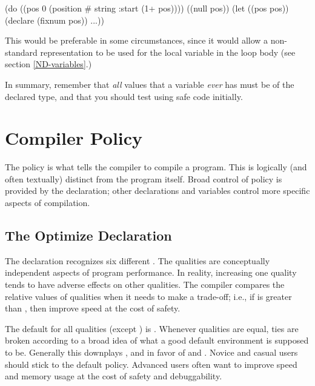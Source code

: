 \begin{example}
(do ((pos 0 (position # string :start (1+ pos))))
    ((null pos))
  (let ((pos pos))
    (declare (fixnum pos))
    ...))
\end{example}

This would be preferable in some circumstances, since it would allow a
non-standard representation to be used for the local 
variable in the loop body (see section \ref{ND-variables}.)

In summary, remember that {\em all} values that a variable {\em ever}
has must be of the declared type, and that you should test using safe
code initially.


\section{Compiler Policy}
\label{compiler-policy}

The policy is what tells the compiler  to compile a program.
This is logically (and often textually) distinct from the program
itself.  Broad control of policy is provided by the 
declaration; other declarations and variables control more specific
aspects of compilation.


\subsection{The Optimize Declaration}
\label{optimize-declaration}

The  declaration recognizes six different
.  The qualities are conceptually independent aspects
of program performance.  In reality, increasing one quality tends to
have adverse effects on other qualities.  The compiler compares the
relative values of qualities when it needs to make a trade-off; i.e.,
if  is greater than , then improve speed at
the cost of safety.

The default for all qualities (except ) is .
Whenever qualities are equal, ties are broken according to a broad
idea of what a good default environment is supposed to be.  Generally
this downplays ,  and  in
favor of  and .  Novice and casual users
should stick to the default policy.  Advanced users often want to
improve speed and memory usage at the cost of safety and
debuggability.

